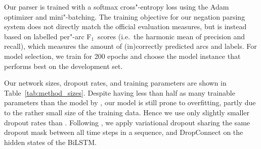 \documentclass[11pt,a4paper]{article}
\theoremstyle{plain}
\def\fscore{F$_1$}
\begin{document}
Our parser is trained with a softmax cross"-entropy loss using the
Adam optimizer \citep{kingma2015adam} and mini"-batching.
The training objective for our negation parsing system does not
directly match the official evaluation measures, but is instead based
on labelled per"-arc \fscore\ scores (i.e.\ the harmonic mean of precision and recall),
which measures the amount of (in)correctly predicted arcs and labels.
For model selection, we train for 200 epochs and choose the model instance that performs best on the development set.

Our network sizes, dropout rates, and training parameters are shown in Table~\ref{tab:method_sizes}.
Despite having less than half as many trainable parameters than the model by
\citet{dozat2018simpler}, our model is still prone to overfitting, partly due
to the rather small size of the training data.
Hence we use only slightly smaller dropout rates than
\citet{dozat2018simpler}.
Following \citet{gal2016theoretically}, we apply variational dropout
sharing the same dropout mask between all time steps in a sequence,
and DropConnect \citep{wan2013regularization,merity2017regularizing}
on the hidden states of the BiLSTM.
\end{document}
